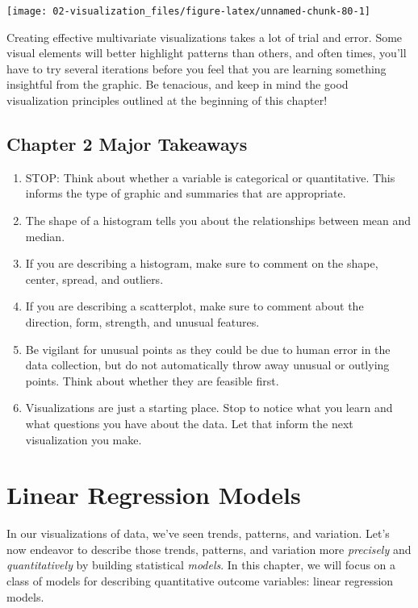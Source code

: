 \documentclass[
]{book}
\begin{document}
\begin{center}\texttt{[image: 02-visualization\_files/figure-latex/unnamed-chunk-80-1]} \end{center}

Creating effective multivariate visualizations takes a lot of trial and error. Some visual elements will better highlight patterns than others, and often times, you'll have to try several iterations before you feel that you are learning something insightful from the graphic. Be tenacious, and keep in mind the good visualization principles outlined at the beginning of this chapter!

\hypertarget{chapter-2-major-takeaways}{%
\section{Chapter 2 Major Takeaways}\label{chapter-2-major-takeaways}}

\begin{enumerate}
\def\labelenumi{\arabic{enumi}.}
\item
  STOP: Think about whether a variable is categorical or quantitative. This informs the type of graphic and summaries that are appropriate.
\item
  The shape of a histogram tells you about the relationships between mean and median.
\item
  If you are describing a histogram, make sure to comment on the shape, center, spread, and outliers.
\item
  If you are describing a scatterplot, make sure to comment about the direction, form, strength, and unusual features.
\item
  Be vigilant for unusual points as they could be due to human error in the data collection, but do not automatically throw away unusual or outlying points. Think about whether they are feasible first.
\item
  Visualizations are just a starting place. Stop to notice what you learn and what questions you have about the data. Let that inform the next visualization you make.
\end{enumerate}

\hypertarget{linear-regression-models}{%
\chapter{Linear Regression Models}\label{linear-regression-models}}

In our visualizations of data, we've seen trends, patterns, and variation. Let's now endeavor to describe those trends, patterns, and variation more \emph{precisely} and \emph{quantitatively} by building statistical \emph{models}. In this chapter, we will focus on a class of models for describing quantitative outcome variables: linear regression models.
\end{document}
